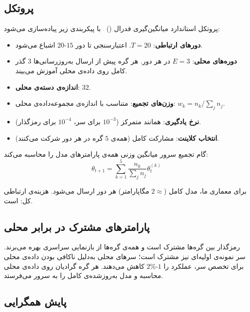\subsection{پروتکل }

پروتکل استاندارد میانگین‌گیری فدرال ()~\cite{mcmahan2017communication} با پیکربندی زیر پیاده‌سازی می‌شود:
\begin{itemize}
\item \textbf{دورهای ارتباطی}: $T = 20$.  اعتبارسنجی تا دور $15$-$20$ اشباع می‌شود.
\item \textbf{دوره‌های محلی}: $E = 3$ در هر دور. هر گره پیش از ارسال به‌روزرسانی‌ها $3$ گذر کامل روی داده‌ی محلی آموزش می‌بیند.
\item \textbf{اندازه‌ی دسته‌ی محلی}: $32$.
\item \textbf{وزن‌های تجمیع}: متناسب با اندازه‌ی مجموعه‌داده‌ی محلی: $w_k = n_k / \sum_j n_j$.
\item \textbf{نرخ یادگیری}: همانند متمرکز ($10^{-3}$ برای سر، $10^{-4}$ برای رمزگذار).
\item \textbf{انتخاب کلاینت}: مشارکت کامل (همه‌ی $5$ گره در هر دور شرکت می‌کنند).
\end{itemize}

گام تجمیع سرور میانگین وزنی همه‌ی پارامترهای مدل را محاسبه می‌کند:
\begin{equation}
\theta_{t+1} = \sum_{k=1}^{5} \frac{n_k}{\sum_j n_j} \theta_{t}^{(k)}
\end{equation}

برای معماری ما، مدل کامل ($\approx$$2$ مگاپارامتر) هر دور ارسال می‌شود. هزینه‌ی ارتباطی کل:  است.

\subsection{پارامترهای مشترک در برابر محلی}

رمزگذار  بین گره‌ها مشترک است و همه‌ی گره‌ها از بازنمایی سراسری بهره می‌برند. سر نمونه‌ی اولیه‌ای نیز مشترک است؛ سرهای محلی به‌دلیل ناکافی بودن داده‌ی محلی برای تخصص سر، عملکرد را $1$-$2\%$  کاهش می‌دهند. هر گره گرادیان روی داده‌ی محلی محاسبه و مدل به‌روزشده‌ی کامل را به سرور می‌فرستد.

\subsection{پایش همگرایی}

